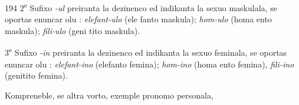 \begin{VUpage}[198]{194}
2\textsuperscript{e} Sufixo \textit{-ul} preiranta la dezinenco ed indikanta la\nl
sexuo maskulala, se oportas enuncar olu : \textit{elefant-ulo} (ele\cc
fanto maskula); \textit{hom-ulo} (homa ento maskula); \textit{fili-ulo} (geni\cc
tito maskula).

3\textsuperscript{e} Sufixo \textit{-in} preiranta la dezinenco ed indikanta la sexuo\nl
feminala, se oportas enuncar olu : \textit{elefant-ino} (elefanto\nl
femina); \textit{hom-ino} (homa ento femina), \textit{fili-ino} (genitito\nl
femina).

Kompreneble, se altra vorto, exemple pronomo personala,\parplein
\end{VUpage}

